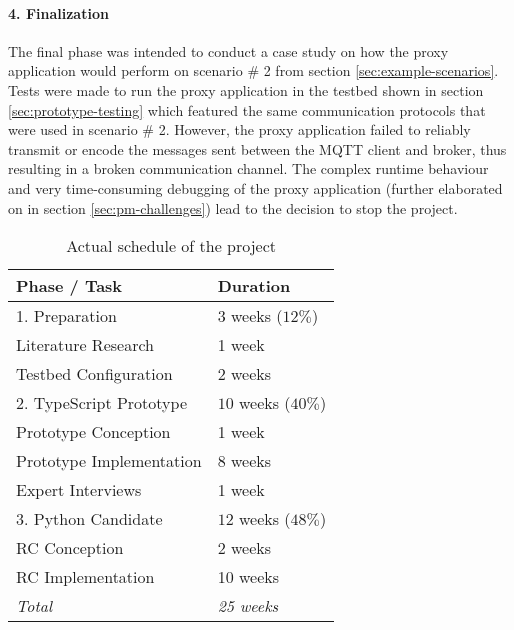 \paragraph{4. Finalization} The final phase was intended to conduct a case study on how the proxy application would perform on scenario \# 2 from section \ref{sec:example-scenarios}. Tests were made to run the proxy application in the testbed shown in section \ref{sec:prototype-testing} which featured the same communication protocols that were used in scenario \# 2. However, the proxy application failed to reliably transmit or encode the messages sent between the \ac{MQTT} client and broker, thus resulting in a broken communication channel. The complex runtime behaviour and very time-consuming debugging of the proxy application (further elaborated on in section \ref{sec:pm-challenges}) lead to the decision to stop the project.

\begin{table}
    \centering
    \begin{tabular}{l l}
        \toprule
        Phase / Task             & Duration            \\
        \midrule
        1. Preparation           & $3$ weeks ($12\%$)  \\
        \midrule
        Literature Research      & 1 week              \\
        Testbed Configuration    & 2 weeks             \\
        \midrule
        2. TypeScript Prototype  & $10$ weeks ($40\%$) \\
        \midrule
        Prototype Conception     & 1 week              \\
        Prototype Implementation & 8 weeks             \\
        Expert Interviews        & 1 week              \\
        \midrule
        3. Python Candidate      & $12$ weeks ($48\%$) \\
        \midrule
        RC Conception            & 2 weeks             \\
        RC Implementation        & 10 weeks            \\
        \midrule
        \midrule
        \emph{Total}             & \emph{25 weeks}     \\
        \bottomrule
    \end{tabular}
    \caption{Actual schedule of the project}
    \label{fig:thesis-schedule-actual}
\end{table}

